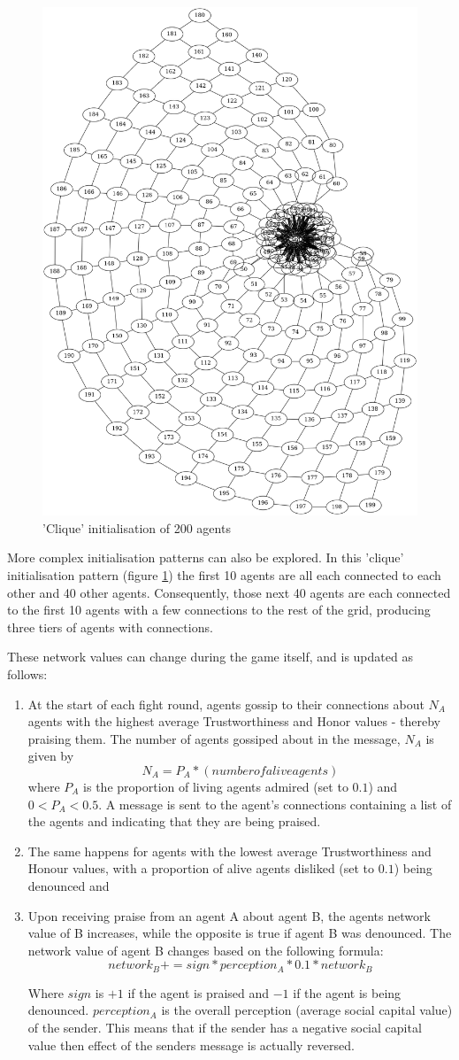 \begin{figure}[!ht]
    \centering
    \includegraphics[width=0.4\linewidth]{004_team_1_agent_design/images/sc_network_clique.png}
    \caption{'Clique' initialisation of 200 agents}
    \label{fig:sc_network_clique}
\end{figure}

More complex initialisation patterns can also be explored. In this 'clique' initialisation pattern (figure \ref{fig:sc_network_clique}) the first 10 agents are all each connected to each other and 40 other agents. Consequently, those next 40 agents are each connected to the first 10 agents with a few connections to the rest of the grid, producing three tiers of agents with connections.

These network values can change during the game itself, and is updated as follows:
\begin{enumerate}
    \item At the start of each fight round, agents gossip to their connections about $N_A$ agents with the highest average Trustworthiness and Honor values - thereby praising them. The number of agents gossiped about in the message, $N_A$ is given by 
    \[
    N_A = P_A * (number of alive agents)
    \]
    where $P_A$ is the proportion of living agents admired (set to $0.1$) and $0 < P_A < 0.5$. A message is sent to the agent's connections containing a list of the agents and indicating that they are being praised.
    \item The same happens for agents with the lowest average Trustworthiness and Honour values, with a proportion of alive agents disliked (set to $0.1$) being denounced and 
    \item Upon receiving praise from an agent A about agent B, the agents network value of B increases, while the opposite is true if agent B was denounced. The network value of agent B changes based on the following formula:
    \[
    network_B += sign * perception_A * 0.1 * network_B
    \]
    
    Where $sign$ is $+1$ if the agent is praised and $-1$ if the agent is being denounced. $perception_A$ is the overall perception (average social capital value) of the sender. This means that if the sender has a negative social capital value then effect of the senders message is actually reversed.
\end{enumerate}

